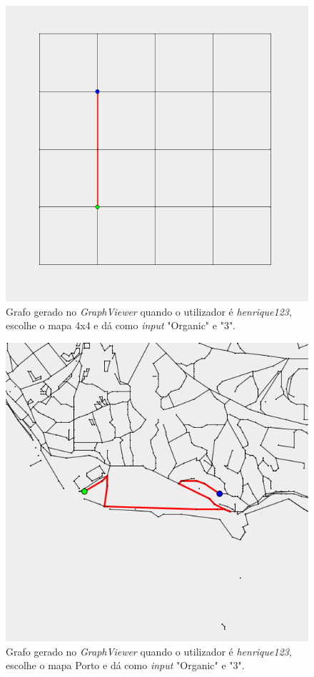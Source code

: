 \documentclass[article, a4paper, 12pt, oneside]{memoir}
\begin{document}
\begin{itemize}
	\begin{figure}[h!]
  		\centerline{\includegraphics[scale=0.4]{wasteapp_4x4henrique123organic.png}}
  		\caption{Grafo gerado no \textit{GraphViewer} quando o utilizador é \textit{henrique123}, escolhe o mapa 4x4 e dá como \textit{input} "Organic" e "3".}
	\end{figure}
	
	\begin{figure}[h!]
  		\centerline{\includegraphics[scale=0.4]{wasteapp_portohenrique123organic.png}}
  		\caption{Grafo gerado no \textit{GraphViewer} quando o utilizador é \textit{henrique123}, escolhe o mapa Porto e dá como \textit{input} "Organic" e "3".}
	\end{figure}
	

\end{itemize}
\end{document}
